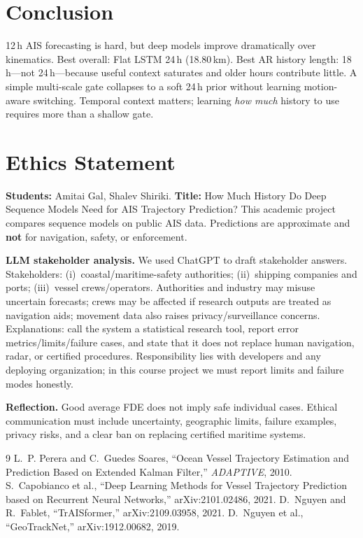 \documentclass[11pt,a4paper]{article}
\begin{document}
\section{Conclusion}
\vspace{-0.25em}
12\,h AIS forecasting is hard, but deep models improve dramatically over kinematics. Best overall: Flat LSTM 24\,h (18.80\,km). Best AR history length: 18\,h---not 24\,h---because useful context saturates and older hours contribute little. A simple multi-scale gate collapses to a soft 24\,h prior without learning motion-aware switching. Temporal context matters; learning \emph{how much} history to use requires more than a shallow gate.

\section{Ethics Statement}
\vspace{-0.25em}
\textbf{Students:} Amitai Gal, Shalev Shiriki.
\textbf{Title:} How Much History Do Deep Sequence Models Need for AIS Trajectory Prediction?
This academic project compares sequence models on public AIS data. Predictions are approximate and \textbf{not} for navigation, safety, or enforcement.

\textbf{LLM stakeholder analysis.} We used ChatGPT to draft stakeholder answers. Stakeholders: (i)~coastal/maritime-safety authorities; (ii)~shipping companies and ports; (iii)~vessel crews/operators. Authorities and industry may misuse uncertain forecasts; crews may be affected if research outputs are treated as navigation aids; movement data also raises privacy/surveillance concerns.
Explanations: call the system a statistical research tool, report error metrics/limits/failure cases, and state that it does not replace human navigation, radar, or certified procedures. Responsibility lies with developers and any deploying organization; in this course project we must report limits and failure modes honestly.

\textbf{Reflection.} Good average FDE does not imply safe individual cases. Ethical communication must include uncertainty, geographic limits, failure examples, privacy risks, and a clear ban on replacing certified maritime systems.

\begin{thebibliography}{9}
\footnotesize
{} L.~P. Perera and C.~Guedes Soares, ``Ocean Vessel Trajectory Estimation and Prediction Based on Extended Kalman Filter,'' \emph{ADAPTIVE}, 2010.
 S.~Capobianco et al., ``Deep Learning Methods for Vessel Trajectory Prediction based on Recurrent Neural Networks,'' arXiv:2101.02486, 2021.
 D.~Nguyen and R.~Fablet, ``TrAISformer,'' arXiv:2109.03958, 2021.
 D.~Nguyen et al., ``GeoTrackNet,'' arXiv:1912.00682, 2019.
\end{thebibliography}
\end{document}
